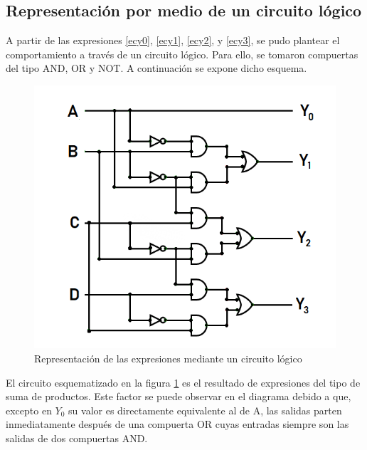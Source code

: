 \subsection{Representaci\'on por medio de un circuito l\'ogico}

\noindent
A partir de las expresiones \ref{ecy0},  \ref{ecy1}, \ref{ecy2}, y \ref{ecy3}, se pudo plantear el comportamiento a trav\'es de un circuito l\'ogico. Para ello, se tomaron compuertas del tipo AND, OR y NOT. A continuaci\'on se expone dicho esquema.

\begin{figure}[h!]
    \centering
    \includegraphics[scale=0.6]{images/ej4/logiccircuitej4.png}
    \caption{Representaci\'on de las expresiones mediante un circuito l\'ogico}
    \label{fig:circuito4fig}
\end{figure}

\noindent
El circuito esquematizado en la figura \ref{fig:circuito4fig} es el resultado de expresiones del tipo de suma de productos. Este factor se puede observar en el diagrama debido a que, excepto en $Y_0$ su valor es directamente equivalente al de A, las salidas parten inmediatamente despu\'es de una compuerta OR cuyas entradas siempre son las salidas de dos compuertas AND. 